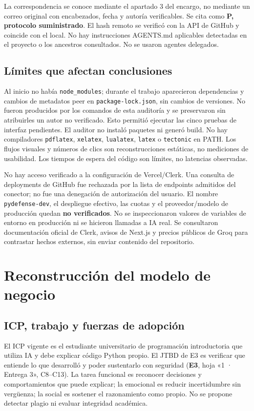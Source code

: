 \documentclass[11pt,a4paper]{report}
\newcommand{\xl}[3]{\textbf{#1}, hoja «#2», #3}
\begin{document}
La correspondencia se conoce mediante el apartado 3 del encargo, no mediante un correo original con encabezados, fecha y autoría verificables. Se cita como \textbf{P, protocolo suministrado}. El hash remoto se verificó con la API de GitHub y coincide con el local. No hay instrucciones AGENTS.md aplicables detectadas en el proyecto o los ancestros consultados. No se usaron agentes delegados.

\section{Límites que afectan conclusiones}
Al inicio no había \texttt{node\_modules}; durante el trabajo aparecieron dependencias y cambios de metadatos peer en \nolinkurl{package-lock.json}, sin cambios de versiones. No fueron producidos por los comandos de esta auditoría y se preservaron sin atribuirles un autor no verificado. Esto permitió ejecutar las cinco pruebas de interfaz pendientes. El auditor no instaló paquetes ni generó build. No hay compiladores \texttt{pdflatex}, \texttt{xelatex}, \texttt{lualatex}, \texttt{latex} o \texttt{tectonic} en PATH. Los flujos visuales y números de clics son reconstrucciones estáticas, no mediciones de usabilidad. Los tiempos de espera del código son límites, no latencias observadas.

No hay acceso verificado a la configuración de Vercel/Clerk. Una consulta de deployments de GitHub fue rechazada por la lista de endpoints admitidos del conector; no fue una denegación de autorización del usuario. El nombre \texttt{pydefense-dev}, el despliegue efectivo, las cuotas y el proveedor/modelo de producción quedan \textbf{no verificados}. No se inspeccionaron valores de variables de entorno en producción ni se hicieron llamadas a IA real. Se consultaron documentación oficial de Clerk, avisos de Next.js y precios públicos de Groq para contrastar hechos externos, sin enviar contenido del repositorio.

\chapter{Reconstrucción del modelo de negocio}
\label{ch:negocio}
\section{ICP, trabajo y fuerzas de adopción}
El ICP vigente es el estudiante universitario de programación introductoria que utiliza IA y debe explicar código Python propio. El JTBD de E3 es verificar que entiende lo que desarrolló y poder sustentarlo con seguridad (\xl{E3}{1 · Entrega 3}{C8--C13}). La tarea funcional es reconocer decisiones y comportamientos que puede explicar; la emocional es reducir incertidumbre sin vergüenza; la social es sostener el razonamiento como propio. No se propone detectar plagio ni evaluar integridad académica.
\end{document}
